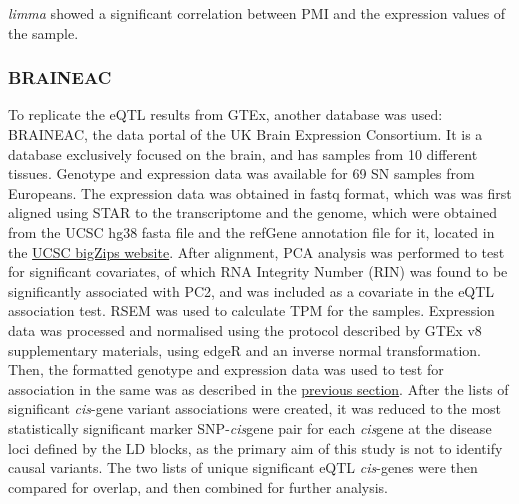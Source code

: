 \documentclass{article}
\begin{document}
\textit{limma}\cite{Ritchie2015LimmaStudies} showed a significant correlation between PMI and the expression values of the sample.

\subsubsection{BRAINEAC}
To replicate the eQTL results from GTEx, another database was used: BRAINEAC\cite{Ramasamy2014GeneticBrain}, the data portal of the UK Brain Expression Consortium. It is a database exclusively focused on the brain, and has samples from 10 different tissues. Genotype and expression data was available for 69 SN samples from Europeans. The expression data was obtained in fastq format, which was was first aligned using STAR\cite{Dobin2013STAR:Aligner} to the transcriptome and the genome, which were obtained from the UCSC hg38 fasta file and the refGene annotation file for it, located in the \href{https://hgdownload.soe.ucsc.edu/goldenPath/hg38/bigZips/}{UCSC bigZips website}. After alignment, PCA analysis was performed to test for significant covariates, of which RNA Integrity Number (RIN) was found to be significantly associated with PC2, and was included as a covariate in the eQTL association test.
RSEM\cite{Li2011RSEM:Genome} was used to calculate TPM for the samples. Expression data was processed and normalised using the protocol described by GTEx v8 supplementary materials\cite{Aguet2020TheTissues}, using edgeR\cite{Robinson2010ttedgeR/ttData} and an inverse normal transformation. Then, the formatted genotype and expression data was used to test for association in the same was as described in the \hyperref[subsec:GTEx]{previous section}. After the lists of significant \textit{cis}-gene variant associations were created, it was reduced to the most statistically significant marker SNP-\textit{cis}gene pair for each \textit{cis}gene at the disease loci defined by the LD blocks, as the primary aim of this study is not to identify causal variants. The two lists of unique significant eQTL \textit{cis}-genes were then compared for overlap, and then combined for further analysis. 
\end{document}
